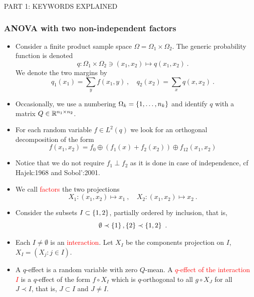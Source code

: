 \documentclass[xcolor=svgnames]{beamer}
\newcommand{\rosso}[1]{\textcolor{red}{#1}}
\renewcommand{\emph}{\rosso}
\begin{document}
\begin{frame}

\huge PART 1: KEYWORDS EXPLAINED
    
\end{frame}

    \begin{frame}\small\frametitle{ANOVA with two non-independent factors}

    \begin{itemize}
    \item Consider a finite product sample space $\Omega = \Omega_1 \times \Omega_2$. The generic probability function is denoted
    \begin{equation*}
       q \colon  \Omega_1 \times \Omega _2 \ni (x_1,x_2) \mapsto q(x_1,x_2) \ . 
    \end{equation*}
    We denote the two margins by 
    \begin{equation*}
    q_1(x_1) = \sum_y f(x_1,y) \ , \quad q_2(x_2) = \sum_x q(x,x_2) \ .
    \end{equation*}
    \item Occasionally, we use a numbering $\Omega_k = \left\{1,\dots,n_k\right\}$ and identify $q$ with a matrix $Q \in \mathbb{R}^{n_1 \times n_2}$.
    \item For each random variable $f \in L^2(q)$ we look for an orthogonal decomposition of the form
    \begin{equation*}
        f(x_1,x_2) = f_0 \oplus (f_1(x) + f_2(x_2)) \oplus f_{12}(x_1,x_2)
    \end{equation*}
    \item Notice that we do not require $f_1 \perp f_2$ as it is done in case of independence, cf Hajek:1968 and Sobol':2001.
    \item We call \emph{factors} the two projections \begin{equation*}
    X_1 \colon (x_1,x_2) \mapsto x_1 \ , \quad X_2 \colon (x_1,x_2) \mapsto x_2 \ .  
    \end{equation*}
  \item Consider the subsets $I \subset \left\{1,2\right\}$, partially ordered by inclusion, that is, 
\begin{equation*}\emptyset \prec \set{1},\set{2} \prec \set{1,2} \ .
\end{equation*}
\item  Each $I \neq \emptyset$ is an \emph{interaction}. 
   Let $X_I$ be the components projection on $I$, $X_I = (X_j \colon j \in I)$.
    \item A $q$-effect is a random variable with zero $Q$-mean. A \emph{$q$-effect of the interaction $I$} is a $q$-effect of the form $f\circ X_I$ which is $q$-orthogonal to all $g \circ X_J$ for all $J \prec I$, that is, $J \subset I$ and $J \neq I$.

\end{itemize}
\end{frame}
\end{document}
